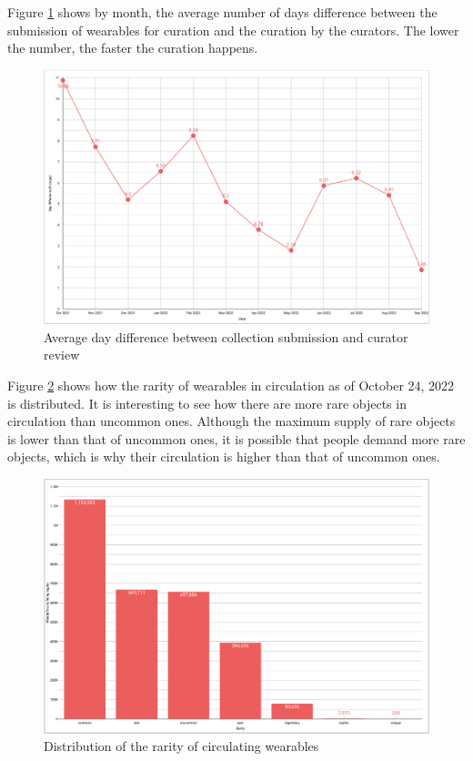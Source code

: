 \documentclass[MSE,Master,english]{twbook}%
\begin{document}
Figure \ref{fig:day_difference} shows by month, the average number of days difference between the submission of wearables for curation and the curation by the curators. The lower the number, the faster the curation happens.
\begin{figure}[H]
  \centering
  \includegraphics[width=\textwidth]{metrics/day_difference.png}
  \caption{Average day difference between collection submission and curator review}
  \label{fig:day_difference}
\end{figure}

Figure \ref{fig:rarity_distribution} shows how the rarity of wearables in circulation as of October 24, 2022 is distributed. It is interesting to see how there are more rare objects in circulation than uncommon ones. Although the maximum supply of rare objects is lower than that of uncommon ones, it is possible that people demand more rare objects, which is why their circulation is higher than that of uncommon ones.
\begin{figure}[H]
  \centering
  \includegraphics[width=\textwidth]{metrics/rarity_distribution.png}
  \caption{Distribution of the rarity of circulating wearables}
  \label{fig:rarity_distribution}
\end{figure}
\end{document}
